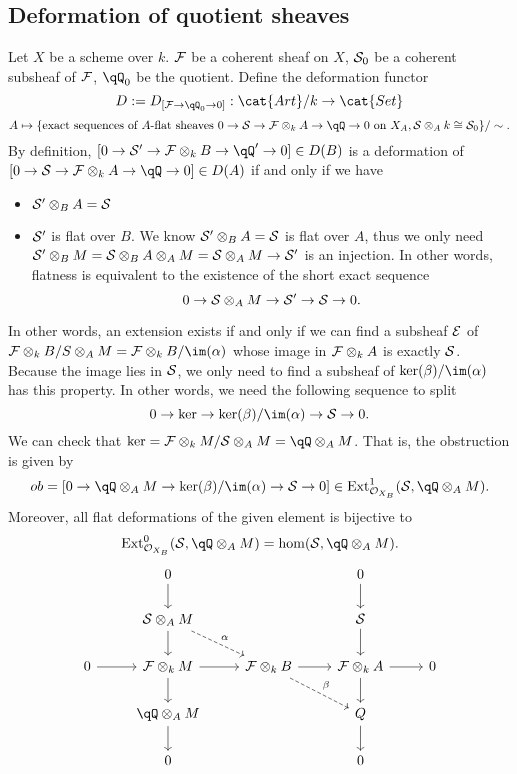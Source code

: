 \documentclass[../main.tex]{subfiles}
\begin{document}
\subsection{Deformation of quotient sheaves}
Let $X$ be a scheme over $k$. $\F$ be a coherent sheaf on $X$, $\S_{0}$ be a coherent subsheaf of $\F$, $\qQ_{0}$ be the quotient. Define the deformation functor
$$D:=D_{[\F\rightarrow \qQ_{0}\rightarrow 0]}: \cat{Art}/k\rightarrow \cat{Set}$$
$$A\mapsto \{ \text{exact sequences of } A\text{-flat sheaves } 0\rightarrow \S\rightarrow \F\otimes_{k}A\rightarrow \qQ\rightarrow 0 \text{ on } X_{A},  \S\otimes_{A}k\cong \S_{0} \}/\sim.$$
By definition, $[0\rightarrow \S'\rightarrow \F\otimes_{k}B\rightarrow \qQ'\rightarrow 0]\in D(B)$ is a deformation of $[0\rightarrow \S\rightarrow \F\otimes_{k}A\rightarrow \qQ\rightarrow 0]\in D(A)$ if and only if we have 
\begin{itemize}
\item $\S'\otimes_{B}A=\S$
\item $\S'$ is flat over $B$. We know $\S'\otimes_{B}A=\S$ is flat over $A$, thus we only need $\S'\otimes_{B} M=\S\otimes_{B}A\otimes_{A}M=\S\otimes_{A}M \rightarrow \S'$ is an injection. In other words, flatness is equivalent to the existence of the short exact sequence
$$0\rightarrow \S\otimes_{A}M\rightarrow \S'\rightarrow \S\rightarrow 0.$$
\end{itemize}
In other words, an extension exists if and only if we can find a subsheaf $\E$ of  $\F\otimes_{k}B/S\otimes_{A}M=\F\otimes_{k}B/\im(\alpha)$ whose image in $\F\otimes_{k}A$ is exactly $\S$. Because the image lies in $\S$, we only need to find a subsheaf of $\ker(\beta)/\im(\alpha)$ has this property. In other words, we need the following sequence to split
$$0\rightarrow \ker\rightarrow \ker(\beta)/\im(\alpha)\rightarrow \S\rightarrow 0.$$
We can check that $\ker=\F\otimes_{k}M/\S\otimes_{A}M=\qQ\otimes_{A}M$. That is, the obstruction is given by 
$$ob=[0\rightarrow \qQ\otimes_{A}M\rightarrow \ker(\beta)/\im(\alpha)\rightarrow \S\rightarrow 0]\in \ext^{1}_{\O_{X_{B}}}(\S, \qQ\otimes_{A}M).$$
Moreover, all flat deformations of the given element is bijective to 
$$\ext^{0}_{\O_{X_{B}}}(\S, \qQ\otimes_{A}M)=\hom(\S, \qQ\otimes_{A}M).$$ 
$$\begin{tikzcd}
& 0\arrow{d} & & 0 \arrow{d}\\
& \S\otimes_{A}M\arrow{d}\arrow[dashrightarrow]{dr}{\alpha}& & \S\arrow{d}\\ 
0\arrow{r} & \F\otimes_{k}M\arrow{r}\arrow{d}& \F\otimes_{k}B\arrow[dashrightarrow]{dr}{\beta}\arrow{r}& \F\otimes_{k}A\arrow{r}\arrow{d} & 0\\
&\qQ\otimes_{A}M\arrow{d} & &Q\arrow{d}\\
& 0 & &0
\end{tikzcd}
$$
\end{document}
